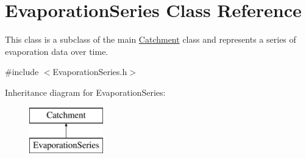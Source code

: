 \hypertarget{classEvaporationSeries}{}\section{Evaporation\+Series Class Reference}
\label{classEvaporationSeries}


This class is a subclass of the main {\ttfamily \mbox{\hyperlink{classCatchment}{Catchment}}} class and represents a series of evaporation data over time.  




{\ttfamily \#include $<$Evaporation\+Series.\+h$>$}

Inheritance diagram for Evaporation\+Series\+:\begin{figure}[H]
\begin{center}
\leavevmode
\includegraphics[height=2.000000cm]{classEvaporationSeries}
\end{center}
\end{figure}
